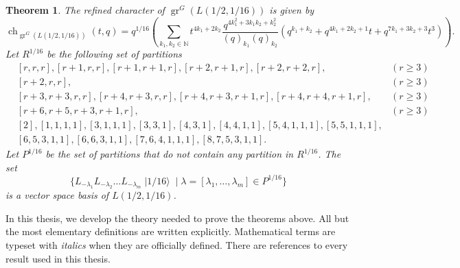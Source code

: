 \documentclass[a4paper, 12pt, reqno]{amsart}
\newtheorem{theorem}{Theorem}[section]
\theoremstyle{remark}
\numberwithin{equation}{subsection}
\DeclareMathOperator{\gr}{gr}
\DeclareMathOperator{\ch}{ch}
\DeclareMathOperator{\vacsixteen}{|1/16\rangle}
\begin{document}
\begin{theorem}
  \label{thr:5}
  The refined character of $\gr^G(L(1/2, 1/16))$ is given by
  \begin{equation*}
    \ch_{\gr^G(L(1/2, 1/16))}(t, q) = q^{1/16}\left(\sum_{k_1, k_2 \in \mathbb{N}}t^{4k_1 + 2k_2}\frac{q^{4k_1^2 + 3k_1k_2 + k_2^2}}{(q)_{k_1}(q)_{k_2}}(q^{k_1 + k_2} + q^{4k_1 + 2k_2 + 1}t + q^{7k_1 + 3k_2 + 3}t^3)\right).
  \end{equation*}
  Let $R^{1/16}$ be the following set of partitions
  \begin{align*}
    &[r, r, r], [r + 1, r, r], [r + 1, r + 1, r], [r + 2, r + 1, r], [r + 2, r + 2, r], &(r \ge 3) \\
    &[r + 2, r, r], &(r \ge 3) \\
    &[r + 3, r + 3, r, r], [r + 4, r + 3, r, r],  [r + 4, r + 3, r + 1, r], [r + 4, r + 4, r + 1, r], &(r \ge 3)\\
    &[r + 6, r + 5, r + 3, r + 1, r], &(r \ge 3) \\
    &[2], [1, 1, 1, 1], [3, 1, 1, 1], [3, 3, 1], [4, 3, 1], [4, 4, 1, 1], [5, 4, 1, 1, 1], [5, 5, 1, 1, 1], \\
    &[6, 5, 3, 1, 1], [6, 6, 3, 1, 1], [7, 6, 4, 1, 1, 1], [8, 7, 5, 3, 1, 1].
  \end{align*}
  Let $P^{1/16}$ be the set of partitions that do not contain any partition in $R^{1/16}$.
  The set
  \begin{equation*}
    \{L_{-\lambda_1}L_{-\lambda_2}\dots L_{-\lambda_m}\vacsixteen \mid \lambda = [\lambda_1, \dots, \lambda_m] \in P^{1/16}\}
  \end{equation*}
  is a vector space basis of $L(1/2, 1/16)$.
\end{theorem}

In this thesis, we develop the theory needed to prove the theorems above.
All but the most elementary definitions are written explicitly.
Mathematical terms are typeset with \emph{italics} when they are officially defined.
There are references to every result used in this thesis.
\end{document}

